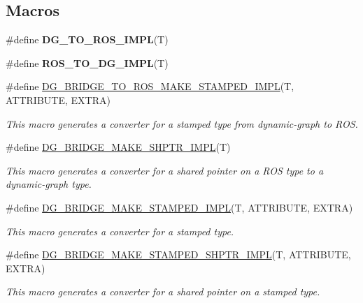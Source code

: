 \subsection*{Macros}
\begin{DoxyCompactItemize}
\item 
\#define {\bfseries D\+G\+\_\+\+T\+O\+\_\+\+R\+O\+S\+\_\+\+I\+M\+PL}(T)
\item 
\#define {\bfseries R\+O\+S\+\_\+\+T\+O\+\_\+\+D\+G\+\_\+\+I\+M\+PL}(T)
\item 
\#define \hyperlink{converter_8hh_ae02c25236f7cecbfbdbf9cc9239cb785}{D\+G\+\_\+\+B\+R\+I\+D\+G\+E\+\_\+\+T\+O\+\_\+\+R\+O\+S\+\_\+\+M\+A\+K\+E\+\_\+\+S\+T\+A\+M\+P\+E\+D\+\_\+\+I\+M\+PL}(T,  A\+T\+T\+R\+I\+B\+U\+TE,  E\+X\+T\+RA)
\begin{DoxyCompactList}\small\item\em This macro generates a converter for a stamped type from dynamic-\/graph to R\+OS. \end{DoxyCompactList}\item 
\#define \hyperlink{converter_8hh_a9de018e745b4235be09aaab744557770}{D\+G\+\_\+\+B\+R\+I\+D\+G\+E\+\_\+\+M\+A\+K\+E\+\_\+\+S\+H\+P\+T\+R\+\_\+\+I\+M\+PL}(T)
\begin{DoxyCompactList}\small\item\em This macro generates a converter for a shared pointer on a R\+OS type to a dynamic-\/graph type. \end{DoxyCompactList}\item 
\#define \hyperlink{converter_8hh_a9ecac683e8b5794b8717b7d2d18c8b22}{D\+G\+\_\+\+B\+R\+I\+D\+G\+E\+\_\+\+M\+A\+K\+E\+\_\+\+S\+T\+A\+M\+P\+E\+D\+\_\+\+I\+M\+PL}(T,  A\+T\+T\+R\+I\+B\+U\+TE,  E\+X\+T\+RA)
\begin{DoxyCompactList}\small\item\em This macro generates a converter for a stamped type. \end{DoxyCompactList}\item 
\#define \hyperlink{converter_8hh_a2c8d741da8bc5978c852fb7b71ec26e7}{D\+G\+\_\+\+B\+R\+I\+D\+G\+E\+\_\+\+M\+A\+K\+E\+\_\+\+S\+T\+A\+M\+P\+E\+D\+\_\+\+S\+H\+P\+T\+R\+\_\+\+I\+M\+PL}(T,  A\+T\+T\+R\+I\+B\+U\+TE,  E\+X\+T\+RA)
\begin{DoxyCompactList}\small\item\em This macro generates a converter for a shared pointer on a stamped type. \end{DoxyCompactList}\end{DoxyCompactItemize}
